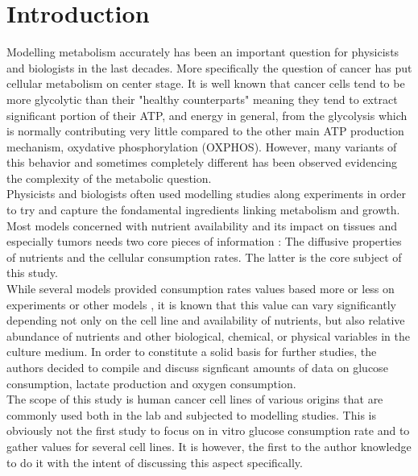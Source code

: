 \documentclass[11pt,a4paper]{article}
\begin{document}
\section{Introduction}
Modelling metabolism accurately has been an important question for physicists and biologists in the last decades. More specifically the question of cancer has put cellular metabolism on center stage. It is well known that cancer cells tend to be more glycolytic than their "healthy counterparts" meaning they tend to extract significant portion of their ATP, and energy in general, from the glycolysis which is normally contributing very little compared to the other main ATP production mechanism, oxydative phosphorylation (OXPHOS). However, many variants of this behavior and sometimes completely different has been observed evidencing the complexity of the metabolic question.\cite{Berg2006}\\

Physicists and biologists often used modelling studies along experiments in order to try and capture the fondamental ingredients linking metabolism and growth. Most models concerned with nutrient availability and its impact on tissues and especially tumors needs two core pieces of information : The diffusive properties of nutrients and the cellular consumption rates. The latter is the core subject of this study.\\

While several models provided consumption rates values based more or less on experiments or other models , it is known that this value can vary significantly depending not only on the cell line and availability of nutrients, but also relative abundance of nutrients and other biological, chemical, or physical variables in the culture medium. In order to constitute a solid basis for further studies, the authors decided to compile and discuss signficant amounts of data on glucose consumption, lactate production and oxygen consumption.\\

The scope of this study is human cancer cell lines of various origins that are commonly used both in the lab and subjected to modelling studies. This is obviously not the first study to focus on in vitro glucose consumption rate and to gather values for several cell lines. It is however, the first to the author knowledge to do it with the intent of discussing this aspect specifically.\\
\end{document}
